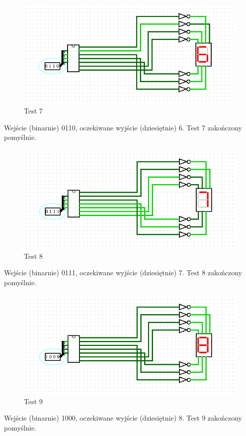 \begin{figure}[H]
    \includegraphics[width=\linewidth]{logisim_screenshots/6.png}
    \caption{Test 7}
    \label{fig:test6}
\end{figure}
Wejście (binarnie) 0110, oczekiwane wyjście (dziesiętnie) 6.\newline
Test 7 zakończony pomyślnie.

\begin{figure}[H]
    \includegraphics[width=\linewidth]{logisim_screenshots/7.png}
    \caption{Test 8}
    \label{fig:test7}
\end{figure}
Wejście (binarnie) 0111, oczekiwane wyjście (dziesiętnie) 7.\newline
Test 8 zakończony pomyślnie.

\begin{figure}[H]
    \includegraphics[width=\linewidth]{logisim_screenshots/8.png}
    \caption{Test 9}
    \label{fig:test8}
\end{figure}
Wejście (binarnie) 1000, oczekiwane wyjście (dziesiętnie) 8.\newline
Test 9 zakończony pomyślnie.

